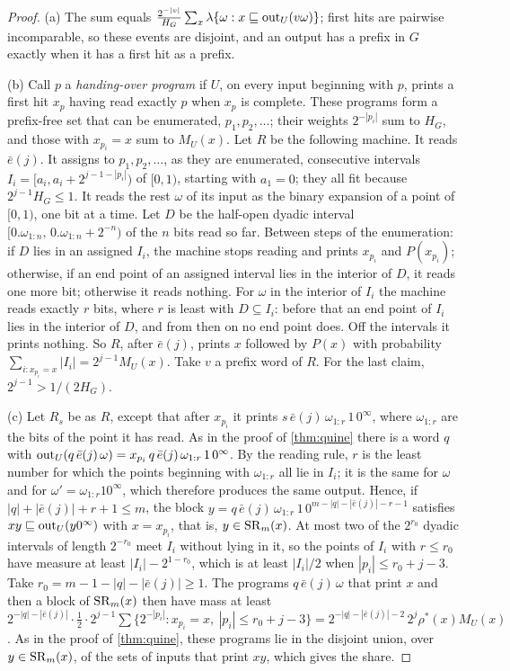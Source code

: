 \begin{proof}
(a) The sum equals $\frac{2^{-|v|}}{H_G}\sum_x\lambda\{\omega:x\sqsubseteq\mathrm{out}_U(v\omega)\}$; first hits are pairwise
incomparable, so these events are disjoint, and an output has a prefix in $G$ exactly when it has a first hit
as a prefix.

(b) Call $p$ a \emph{handing-over program} if $U$, on every input beginning with $p$, prints a first hit $x_p$
having read exactly $p$ when $x_p$ is complete. These programs form a prefix-free set that can be enumerated,
$p_1,p_2,\dots$; their weights $2^{-|p_i|}$ sum to $H_G$, and those with $x_{p_i}=x$ sum to $M_U(x)$. Let $R$
be the following machine. It reads $\bar e(j)$. It assigns to $p_1,p_2,\dots$, as they are enumerated,
consecutive intervals $I_i=[a_i,a_i+2^{j-1-|p_i|})$ of $[0,1)$, starting with $a_1=0$; they all fit because
$2^{j-1}H_G\le1$. It reads the rest $\omega$ of its input as the binary expansion of a point of $[0,1)$, one
bit at a time. Let $D$ be the half-open dyadic interval $[0.\omega_{1:n},\,0.\omega_{1:n}+2^{-n})$ of the $n$
bits read so far. Between steps of the enumeration: if $D$ lies in an assigned $I_i$, the machine stops
reading and prints $x_{p_i}$ and $P(x_{p_i})$; otherwise, if an end point of an assigned interval lies in the
interior of $D$, it reads one more bit; otherwise it reads nothing. For $\omega$ in the interior of $I_i$ the
machine reads exactly $r$ bits, where $r$ is least with $D\subseteq I_i$: before that an end point of $I_i$
lies in the interior of $D$, and from then on no end point does. Off the intervals it prints nothing. So $R$,
after $\bar e(j)$, prints $x$ followed by $P(x)$ with probability
$\sum_{i:x_{p_i}=x}|I_i|=2^{j-1}M_U(x)$. Take $v$ a prefix word of $R$. For the last claim, $2^{j-1}>1/(2H_G)$.

(c) Let $R_s$ be as $R$, except that after $x_{p_i}$ it prints $s\,\bar e(j)\,\omega_{1:r}\,1\,0^\infty$, where
$\omega_{1:r}$ are the bits of the point it has read. As in the proof of \cref{thm:quine} there is a word $q$
with $\mathrm{out}_U(q\,\bar e(j)\,\omega)=x_{p_i}\,q\,\bar e(j)\,\omega_{1:r}\,1\,0^\infty$. By the reading rule, $r$
is the least number for which the points beginning with $\omega_{1:r}$ all lie in $I_i$; it is the same for
$\omega$ and for $\omega'=\omega_{1:r}10^\infty$, which therefore produces the same output. Hence, if
$|q|+|\bar e(j)|+r+1\le m$, the block $y=q\,\bar e(j)\,\omega_{1:r}\,1\,0^{m-|q|-|\bar e(j)|-r-1}$ satisfies
$xy\sqsubseteq\mathrm{out}_U(y0^\infty)$ with $x=x_{p_i}$, that is, $y\in\mathrm{SR}_m(x)$. At most two of the $2^{r_0}$
dyadic intervals of length $2^{-r_0}$ meet $I_i$ without lying in it, so the points of $I_i$ with $r\le r_0$
have measure at least $|I_i|-2^{1-r_0}$, which is at least $|I_i|/2$ when $|p_i|\le r_0+j-3$. Take
$r_0=m-1-|q|-|\bar e(j)|\ge1$. The programs $q\,\bar e(j)\,\omega$ that print $x$ and then a block of $\mathrm{SR}_m(x)$
then have mass at least
$2^{-|q|-|\bar e(j)|}\cdot\frac12\cdot2^{j-1}\sum\{2^{-|p_i|}:x_{p_i}=x,\ |p_i|\le r_0+j-3\}
=2^{-|q|-|\bar e(j)|-2}\,2^{j}\rho^*(x)M_U(x)$. As in the proof of \cref{thm:quine}, these programs lie in
the disjoint union, over $y\in\mathrm{SR}_m(x)$, of the sets of inputs that print $xy$, which gives the share.
\end{proof}

